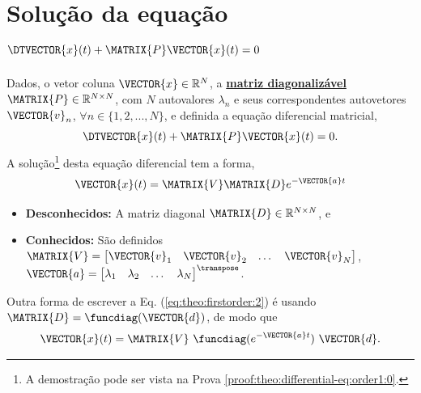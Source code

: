 \section{ Solução da equação $\DTVECTOR{x}(t) + \MATRIX{P} \VECTOR{x}(t)=0$ }

\begin{theorem}[Equação 
$\DTVECTOR{x}(t) + \MATRIX{P} \VECTOR{x}(t)=0$ com matriz $\MATRIX{P}$ diagonalizável:]
\label{theo:differential-eq:order1:0}
Dados, o vetor coluna $\VECTOR{x} \in \mathbb{R}^N$, 
a \hyperref[def:diagonalization0]{\textbf{matriz diagonalizável}} $\MATRIX{P} \in \mathbb{R}^{N\times N}$,
com $N$ autovalores $\lambda_n$ e seus correspondentes autovetores $\VECTOR{v}_n$,
$\forall n \in \{1, 2, ..., N\}$, 
e definida a equação diferencial matricial,
\begin{equation}
\DTVECTOR{x}(t) + \MATRIX{P} \VECTOR{x}(t)=0.
\end{equation}
A solução\footnote{A
demostração pode ser vista na Prova \ref{proof:theo:differential-eq:order1:0}.} desta equação diferencial tem  a forma,
\begin{equation}\label{eq:theo:firstorder:2}
 \VECTOR{x}(t)= \MATRIX{V}\MATRIX{D} e^{-\VECTOR{a}t}
\end{equation}
\begin{itemize}
\item \textbf{Desconhecidos:} A matriz diagonal $\MATRIX{D} \in \mathbb{R}^{N \times N}$, e
\item  \textbf{Conhecidos:} São definidos $\MATRIX{V}=
\begin{bmatrix}
\VECTOR{v}_1 & \VECTOR{v}_2 & \dots & \VECTOR{v}_N
\end{bmatrix}$, 
$\VECTOR{a}=
\begin{bmatrix}
\lambda_1 & \lambda_2 & \dots & \lambda_N
\end{bmatrix}^{\transpose}$.
\end{itemize}
\end{theorem}

\begin{corollary}
\label{coro:differential-eq:order1:0}
Outra forma de escrever a Eq. (\ref{eq:theo:firstorder:2}) é usando $\MATRIX{D}=\funcdiag(\VECTOR{d})$, de modo que
\begin{equation}\label{eq:coro:firstorder:1}
 \VECTOR{x}(t)= \MATRIX{V}~\funcdiag(e^{-\VECTOR{a}t})~\VECTOR{d}.
\end{equation}
\end{corollary}


